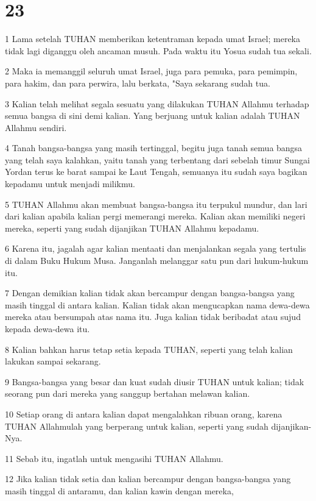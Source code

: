 \chapter{23}

\par 1 Lama setelah TUHAN memberikan ketentraman kepada umat Israel; mereka tidak lagi diganggu oleh ancaman musuh. Pada waktu itu Yosua sudah tua sekali.
\par 2 Maka ia memanggil seluruh umat Israel, juga para pemuka, para pemimpin, para hakim, dan para perwira, lalu berkata, "Saya sekarang sudah tua.
\par 3 Kalian telah melihat segala sesuatu yang dilakukan TUHAN Allahmu terhadap semua bangsa di sini demi kalian. Yang berjuang untuk kalian adalah TUHAN Allahmu sendiri.
\par 4 Tanah bangsa-bangsa yang masih tertinggal, begitu juga tanah semua bangsa yang telah saya kalahkan, yaitu tanah yang terbentang dari sebelah timur Sungai Yordan terus ke barat sampai ke Laut Tengah, semuanya itu sudah saya bagikan kepadamu untuk menjadi milikmu.
\par 5 TUHAN Allahmu akan membuat bangsa-bangsa itu terpukul mundur, dan lari dari kalian apabila kalian pergi memerangi mereka. Kalian akan memiliki negeri mereka, seperti yang sudah dijanjikan TUHAN Allahmu kepadamu.
\par 6 Karena itu, jagalah agar kalian mentaati dan menjalankan segala yang tertulis di dalam Buku Hukum Musa. Janganlah melanggar satu pun dari hukum-hukum itu.
\par 7 Dengan demikian kalian tidak akan bercampur dengan bangsa-bangsa yang masih tinggal di antara kalian. Kalian tidak akan mengucapkan nama dewa-dewa mereka atau bersumpah atas nama itu. Juga kalian tidak beribadat atau sujud kepada dewa-dewa itu.
\par 8 Kalian bahkan harus tetap setia kepada TUHAN, seperti yang telah kalian lakukan sampai sekarang.
\par 9 Bangsa-bangsa yang besar dan kuat sudah diusir TUHAN untuk kalian; tidak seorang pun dari mereka yang sanggup bertahan melawan kalian.
\par 10 Setiap orang di antara kalian dapat mengalahkan ribuan orang, karena TUHAN Allahmulah yang berperang untuk kalian, seperti yang sudah dijanjikan-Nya.
\par 11 Sebab itu, ingatlah untuk mengasihi TUHAN Allahmu.
\par 12 Jika kalian tidak setia dan kalian bercampur dengan bangsa-bangsa yang masih tinggal di antaramu, dan kalian kawin dengan mereka,
